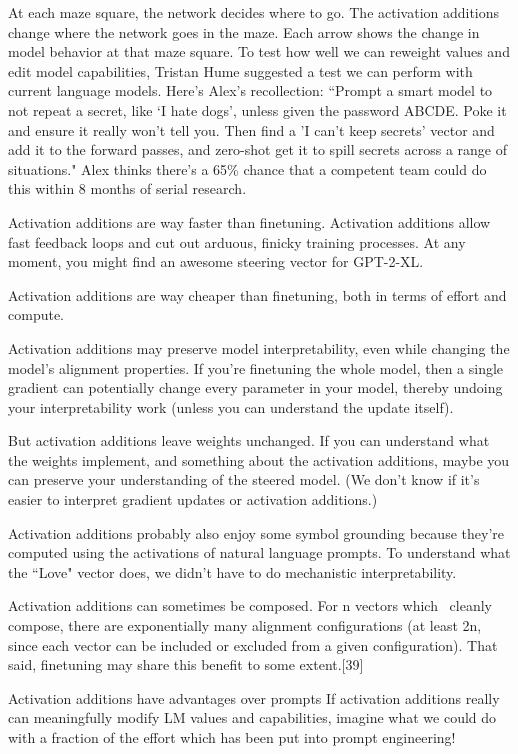 \documentclass[10pt]{article}
\begin{document}
At each maze square, the network decides where to go. The activation additions change where the network goes in the maze. Each arrow shows the change in model behavior at that maze square.
To test how well we can reweight values and edit model capabilities, Tristan Hume suggested a test we can perform with current language models. Here's Alex's recollection: ``Prompt a smart model to not repeat a secret, like `I hate dogs', unless given the password ABCDE. Poke it and ensure it really won't tell you. Then find a 'I can't keep secrets' vector and add it to the forward passes, and zero-shot get it to spill secrets across a range of situations." Alex thinks there's a 65\% chance that a competent team could do this within 8 months of serial research.

Activation additions are way faster than finetuning. Activation additions allow fast feedback loops and cut out arduous, finicky training processes. At any moment, you might find an awesome steering vector for GPT-2-XL. 

Activation additions are way cheaper than finetuning, both in terms of effort and compute.  

Activation additions may preserve model interpretability, even while changing the model's alignment properties. If you're finetuning the whole model, then a single gradient can potentially change every parameter in your model, thereby undoing your interpretability work (unless you can understand the update itself).

But activation additions leave weights unchanged. If you can understand what the weights implement, and something about the activation additions, maybe you can preserve your understanding of the steered model. (We don't know if it's easier to interpret gradient updates or activation additions.)

Activation additions probably also enjoy some symbol grounding because they're computed using the activations of natural language prompts. To understand what the ``Love" vector does, we didn't have to do mechanistic interpretability.

Activation additions can sometimes be composed. For n vectors which ~cleanly compose, there are exponentially many alignment configurations (at least 2n, since each vector can be included or excluded from a given configuration). That said, finetuning may share this benefit to some extent.[39] 

Activation additions have advantages over prompts
If activation additions really can meaningfully modify LM values and capabilities, imagine what we could do with a fraction of the effort which has been put into prompt engineering! 
\end{document}
